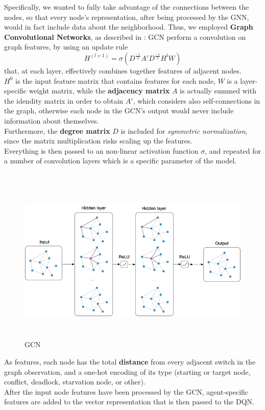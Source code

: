 \noindent
Specifically, we wanted to fully take advantage of the connections between the nodes, so that every node's representation, after being processed by the GNN, would in fact include data about the neighborhood. Thus, we employed \textbf{Graph Convolutional Networks}, as described in \cite{gcn}: GCN perform a convolution on graph features, by using an update rule 
$$H^{(l + 1)} = \sigma(D^{\frac{-1}{2}} A' D^{\frac{-1}{2}} H^{l} W )$$ that, at each layer, effectively combines together features of adjacent nodes.\\ $H^0$ is the input feature matrix that contains features for each node, $W$ is a layer-specific weight matrix, while the \textbf{adjacency matrix} $A$ is actually summed with the idendity matrix in order to obtain $A'$, which considers also self-connections in the graph, otherwise each node in the GCN's output would never include information about themselves. \\
Furthermore, the \textbf{degree matrix} $D$ is included for \textit{symmetric normalization}, since the matrix multiplication risks scaling up the features.\\
Everything is then passed to an non-linear activation function $\sigma$, and repeated for a number of convolution layers which is a specific parameter of the model.\\ \\

\begin{figure}[H] 
\includegraphics[height=80mm, width=140mm, scale=0.5]{chapters/gcn.png}
\centering
\caption{GCN}
\label{fig:s5} 
\end{figure}
\noindent
As features, each node has the total \textbf{distance} from every adjacent switch in the graph observation, and a one-hot encoding of its type (starting or target node, conflict, deadlock, starvation node, or other). \\
After the input node features have been processed by the GCN, agent-specific features are added to the vector representation that is then passed to the DQN.
